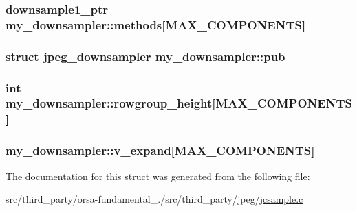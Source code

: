 \subsubsection[{methods}]{\setlength{\rightskip}{0pt plus 5cm}downsample1\+\_\+ptr my\+\_\+downsampler\+::methods\mbox{[}{\bf M\+A\+X\+\_\+\+C\+O\+M\+P\+O\+N\+E\+N\+T\+S}\mbox{]}}\label{structmy__downsampler_a6e74bc63d21fbd97d92dc36f65011a75}
\hypertarget{structmy__downsampler_a3ace227dd4fd9fdf8e8fe542ca6503c3}{}
\subsubsection[{pub}]{\setlength{\rightskip}{0pt plus 5cm}struct {\bf jpeg\+\_\+downsampler} my\+\_\+downsampler\+::pub}\label{structmy__downsampler_a3ace227dd4fd9fdf8e8fe542ca6503c3}
\hypertarget{structmy__downsampler_a60c30dd6034e706ee9d21d0f5f198af7}{}
\subsubsection[{rowgroup\+\_\+height}]{\setlength{\rightskip}{0pt plus 5cm}int my\+\_\+downsampler\+::rowgroup\+\_\+height\mbox{[}{\bf M\+A\+X\+\_\+\+C\+O\+M\+P\+O\+N\+E\+N\+T\+S}\mbox{]}}\label{structmy__downsampler_a60c30dd6034e706ee9d21d0f5f198af7}
\hypertarget{structmy__downsampler_ab3bc55e23e197c2129ae09c82fb62e83}{}
\subsubsection[{v\+\_\+expand}]{ my\+\_\+downsampler\+::v\+\_\+expand\mbox{[}{\bf M\+A\+X\+\_\+\+C\+O\+M\+P\+O\+N\+E\+N\+T\+S}\mbox{]}}\label{structmy__downsampler_ab3bc55e23e197c2129ae09c82fb62e83}


The documentation for this struct was generated from the following file\+:\begin{DoxyCompactItemize}
\item 
src/third\+\_\+party/orsa-\/fundamental\+\_./src/third\+\_\+party/jpeg/\hyperlink{jcsample_8c}{jcsample.\+c}\end{DoxyCompactItemize}

